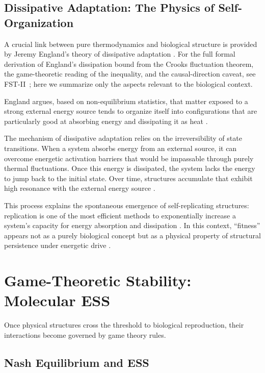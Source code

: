 \documentclass[12pt,a4paper]{article}
\theoremstyle{remark}
\begin{document}
\subsection{Dissipative Adaptation: The Physics of Self-Organization}

A crucial link between pure thermodynamics and biological structure is provided by Jeremy England's theory of dissipative adaptation \citep{England2013,EnglandNano}. For the full formal derivation of England's dissipation bound from the Crooks fluctuation theorem, the game-theoretic reading of the inequality, and the causal-direction caveat, see FST-II~\citep{FSTII}; here we summarize only the aspects relevant to the biological context.

England argues, based on non-equilibrium statistics, that matter exposed to a strong external energy source tends to organize itself into configurations that are particularly good at absorbing energy and dissipating it as heat \citep{England2013}.

The mechanism of dissipative adaptation relies on the irreversibility of state transitions. When a system absorbs energy from an external source, it can overcome energetic activation barriers that would be impassable through purely thermal fluctuations. Once this energy is dissipated, the system lacks the energy to jump back to the initial state. Over time, structures accumulate that exhibit high resonance with the external energy source \citep{EnglandNano}.

This process explains the spontaneous emergence of self-replicating structures: replication is one of the most efficient methods to exponentially increase a system's capacity for energy absorption and dissipation \citep{EnglandNano}. In this context, ``fitness'' appears not as a purely biological concept but as a physical property of structural persistence under energetic drive \citep{England2013}.

\section{Game-Theoretic Stability: Molecular ESS}
\label{sec:molecular}

Once physical structures cross the threshold to biological reproduction, their interactions become governed by game theory rules.

\subsection{Nash Equilibrium and ESS}
\end{document}
